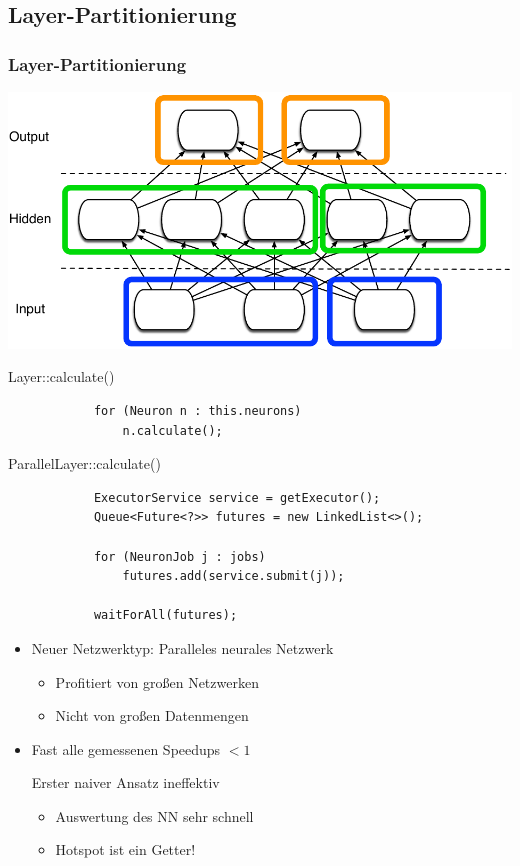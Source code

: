 \documentclass[18pt]{beamer}
\begin{document}
	\subsection{Layer-Partitionierung}
	\begin{frame}\frametitle{Layer-Partitionierung}
	    \includegraphics[scale=0.7]{Grafiken/Feingranular.pdf}
	
	\framebreak

		\begin{block}{Layer::calculate()}
			\begin{lstlisting}
			for (Neuron n : this.neurons) 
			    n.calculate();
	 		\end{lstlisting}
 		\end{block}

		\begin{block}{ParallelLayer::calculate()}
	 		\begin{lstlisting}
			ExecutorService service = getExecutor();
			Queue<Future<?>> futures = new LinkedList<>();

			for (NeuronJob j : jobs)
			    futures.add(service.submit(j));
			
			waitForAll(futures);
	 		\end{lstlisting}
	 	\end{block}

 		\framebreak
	
		\begin{itemize}
			\item Neuer Netzwerktyp: Paralleles neurales Netzwerk
			\begin{itemize}
				\item Profitiert von großen Netzwerken
				\item Nicht von großen Datenmengen
			\end{itemize}
			\item Fast alle gemessenen Speedups $<1$ 
			\begin{block}{Erster naiver Ansatz ineffektiv}
				\begin{itemize}
					\item Auswertung des NN sehr schnell
					\item Hotspot ist ein Getter!
				\end{itemize}
			\end{block}


\end{itemize}
\end{frame}
\end{document}
